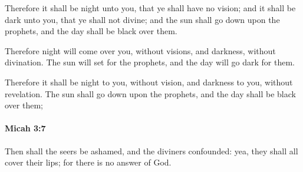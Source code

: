 			\begin{versebox}
					\item[BHS] 
					\item[LXX] 
					\item[ASV] Therefore it shall be night unto you, that ye shall have no vision; and it shall be dark unto you, that ye shall not divine; and the sun shall go down upon the prophets, and the day shall be black over them.
					\item[NIV] Therefore night will come over you, without visions, and darkness, without divination. The sun will set for the prophets, and the day will go dark for them.
					\item[NRSV] Therefore it shall be night to you, without vision, and darkness to you, without revelation. The sun shall go down upon the prophets, and the day shall be black over them;
			\end{versebox}

		\paragraph{Micah 3:7} %
			\label{MICAH-3-7}

			Then shall the seers be ashamed, and the diviners confounded: yea, they shall all cover their lips; for there is no answer of God.

